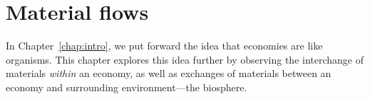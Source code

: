 %
%
%
\chapter{Material flows}
\label{chap:materials} 




In Chapter~\ref{chap:intro}, we put forward the idea that economies are like organisms. 
This chapter explores
this idea further by observing the interchange of materials \emph{within}
an economy, as well as exchanges of materials between an economy and 
surrounding environment---the biosphere. 



